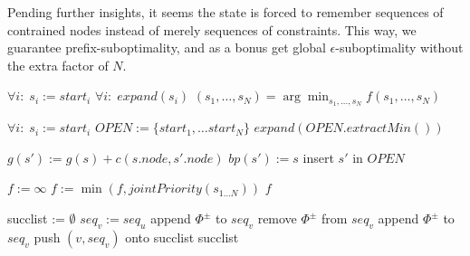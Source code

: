 \documentclass[letterpaper]{article}
\begin{document}
Pending further insights, it seems the state is forced to remember sequences of contrained nodes instead of merely sequences of constraints. This way, we guarantee prefix-suboptimality, and as a bonus get global $\epsilon$-suboptimality without the extra factor of $N$.

\begin{algorithm}
\caption{$MultiAgent A^*HighLevel()$}
\label{alg:update}
\begin{algorithmic}
\STATE $\forall i:\; s_i := start_i$
\STATE $\forall i:\; expand(s_i)$
\STATE $(s_1,\ldots,s_N) = \arg\min_{s_1,\ldots,s_N} f(s_1,\ldots,s_N)$
\ENDWHILE
\end{algorithmic}
\end{algorithm}

\begin{algorithm}
\caption{$MultiAgent A^*()$}
\label{alg:update}
\begin{algorithmic}
\STATE $\forall i:\; s_i := start_i$
\STATE $OPEN := \{start_1,\ldots start_N\}$
\STATE $expand(OPEN.extractMin())$
\ENDWHILE
\end{algorithmic}
\end{algorithm}

\begin{algorithm}
\caption{$expand(s)$}
\label{alg:update}
\begin{algorithmic}
\STATE $g(s') := g(s) + c(s.node,s'.node)$
\STATE $bp(s') := s$
\STATE insert $s'$ in $OPEN$
\ENDIF
\ENDFOR
\end{algorithmic}
\end{algorithm}

\begin{algorithm}
\caption{$f(s)$}
\label{alg:update}
\begin{algorithmic}
\STATE $f := \infty$
\STATE $f := \min(f, jointPriority(s_{1\ldots N}))$
\ENDFOR
\RETURN $f$
\end{algorithmic}
\end{algorithm}

\begin{algorithm}
\caption{$successors(u, seq_u)$}
\label{alg:update}
\begin{algorithmic}
\STATE succlist := $\emptyset$
\STATE $seq_v := seq_u$
\STATE append $\Phi^\pm$ to $seq_v$
\ENDFOR
{}
\STATE remove $\Phi^\pm$ from $seq_v$
\STATE append $\Phi^\pm$ to $seq_v$
\ENDFOR
\STATE push $(v,seq_v)$ onto succlist
\ENDFOR
\RETURN succlist
\end{algorithmic}
\end{algorithm}
\end{document}
